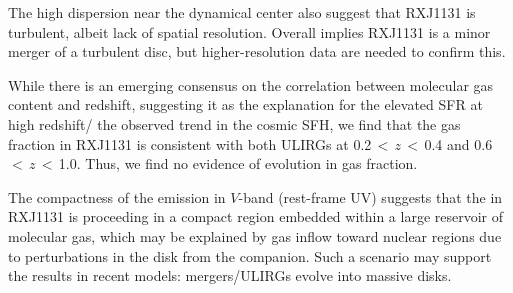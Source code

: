 \documentclass[]{emulateapj}
\begin{document}
The high dispersion near the dynamical center also
suggest that RXJ1131 is turbulent, albeit lack of spatial resolution. Overall
implies RXJ1131 is a minor merger of a turbulent disc, but higher-resolution
data are needed to confirm this.

While there is an emerging consensus on
the correlation between molecular gas content and redshift,
suggesting it as the explanation for the elevated SFR at high redshift/
the observed trend in the cosmic SFH,
we find that the gas fraction in RXJ1131 is consistent with both ULIRGs at
 0.2\,$<$\,$z$\,$<$\,0.4
and 0.6\,$<$\,$z$\,$<$\,1.0. Thus, we find no evidence of 
evolution in gas fraction.

The compactness of the emission in $V$-band (rest-frame UV)
suggests that the \SF in RXJ1131 is proceeding in a
compact region embedded within a large reservoir of molecular gas, 
which may be explained by gas inflow toward nuclear regions due to
perturbations in the disk from the companion.
Such a scenario may support the results in recent models: mergers/ULIRGs evolve into massive disks.


\end{document}
